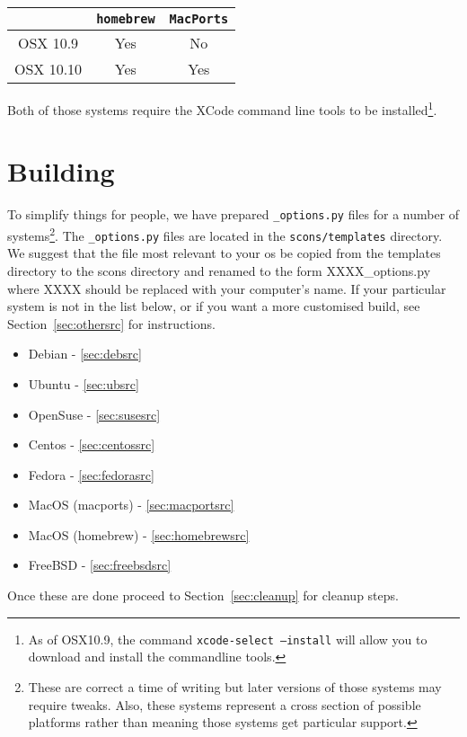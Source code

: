\begin{center}
\begin{tabular}{|c|c|c|}\hline
 & \texttt{homebrew} & \texttt{MacPorts} \\\hline
OSX 10.9 & Yes & No\\\hline
OSX 10.10& Yes & Yes\\\hline
\end{tabular}
\end{center}

\noindent Both of those systems require the XCode command line tools to be installed\footnote{As of OSX10.9, the 
command \texttt{xcode-select --install} will allow you to download and install the commandline tools.}.

\section{Building}\label{sec:build}

To simplify things for people, we have prepared \texttt{_options.py} files for a number of 
systems\footnote{These are correct a time of writing but later versions of those systems may require tweaks. 
Also, these systems represent a cross section of possible platforms rather than meaning those systems get particular support.}.
The \texttt{_options.py} files are located in the \texttt{scons/templates} directory. We suggest that the file most relevant to your os 
be copied from the templates directory to the scons directory and renamed to the form XXXX_options.py where XXXX 
should be replaced with your computer's name.
If your particular system is not in the list below, or if you want a more customised 
build, 
see Section~\ref{sec:othersrc} for instructions.
\begin{itemize}
 \item Debian - \ref{sec:debsrc}
 \item Ubuntu - \ref{sec:ubsrc}
 \item OpenSuse - \ref{sec:susesrc}
 \item Centos - \ref{sec:centossrc}
 \item Fedora - \ref{sec:fedorasrc}
 \item MacOS (macports) - \ref{sec:macportsrc}
 \item MacOS (homebrew) - \ref{sec:homebrewsrc}
 \item FreeBSD - \ref{sec:freebsdsrc}
\end{itemize}

Once these are done proceed to Section~\ref{sec:cleanup} for cleanup steps.

